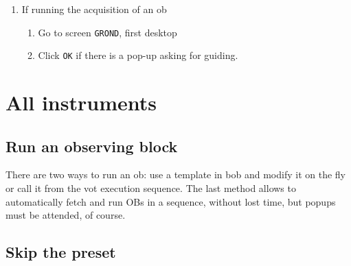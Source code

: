 \documentclass[11pt,fleqn,a4paper]{book}
\begin{document}
\begin{enumerate}
\begin{enumerate}
        \item In \gls{autoguiding} window, adapt \texttt{Integration time}
        \item Click \texttt{Set Int. time}. 
        \item If you need an integration time larger than \texttt{Loop time},
            \begin{enumerate}
                \item Click \texttt{Stop guiding}
                \item Perform point~\ref{list:agcontrolgrond} again with larger values (e.g. 8, 8, 7.99)
                \item Click \texttt{Start guiding}
            \end{enumerate}
    \end{enumerate}
    \item If running the \gls{acquisition} of an \gls{ob}
    \begin{enumerate}
        \item Go to screen \texttt{GROND}, first \gls{desktop}
        \item Click \texttt{OK} if there is a pop-up asking for guiding.
    \end{enumerate}
\end{enumerate}

\section{All instruments}

\subsection{Run an observing block}

There are two ways to run an \gls{ob}: use a \gls{template} in \gls{bob} and modify it on the fly or call it from the \gls{vot} execution sequence.  The last method allows to automatically fetch and run OBs in a sequence, without lost time, but popups must be attended, of course.


\subsection{Skip the preset}
\end{document}
